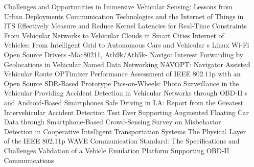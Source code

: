  \cite{pau_challenges_2012} Challenges and Opportunities in Immersive Vehicular Sensing: {{Lessons}} from Urban Deployments \newline 
 \cite{harri_communication_2015} Communication {{Technologies}} and the {{Internet}} of {{Things}} in {{ITS}} \newline 
 \cite{huang_effectively_2017} Effectively {{Measure}} and {{Reduce Kernel Latencies}} for {{Real}}-Time {{Constraints}} \newline 
 \cite{soyturk_vehicular_2016} From Vehicular Networks to Vehicular Clouds in Smart Cities \newline 
 \cite{gerla_internet_2014} Internet of Vehicles: {{From}} Intelligent Grid to Autonomous Cars and Vehicular s \newline 
 \cite{mur_linux_2019} Linux {{Wi}}-{{Fi}} Open Source Drivers -Mac80211, Ath9k/Ath5k- \newline 
 \cite{grassi_navigo_2015} Navigo: {{Interest}} Forwarding by Geolocations in Vehicular {{Named Data Networking}} \newline 
 \cite{kim_navopt_2011} {{NAVOPT}}: {{Navigator Assisted Vehicular Route OPTimizer}} \newline 
 \cite{bloessl_performance_2018} Performance {{Assessment}} of {{IEEE}} 802.11p with an {{Open Source SDR}}-{{Based Prototype}} \newline 
 \cite{gerla_picsonwheels_2013} Pics-on-Wheels: {{Photo}} Surveillance in the Vehicular  \newline 
 \cite{zaldivar_providing_2011} Providing Accident Detection in Vehicular Networks through {{OBD}}-{{II}} s and {{Android}}-Based Smartphones \newline 
 \cite{marfia_safe_2013} Safe {{Driving}} in {{LA}}: {{Report}} from the {{Greatest Intervehicular Accident Detection Test Ever}} \newline 
 \cite{briante_supporting_2014} Supporting Augmented Floating Car Data through Smartphone-Based Crowd-Sensing \newline 
 \cite{van_der_heijden_survey_2016} Survey on {{Misbehavior Detection}} in {{Cooperative Intelligent Transportation Systems}} \newline 
 \cite{abdelgader_physical_2014} The {{Physical Layer}} of the {{IEEE}} 802.11p {{WAVE Communication Standard}}: {{The Specifications}} and {{Challenges}} \newline 
 \cite{alvear_validation_2015} Validation of a Vehicle Emulation Platform Supporting {{OBD}}-{{II}} Communications \newline 
